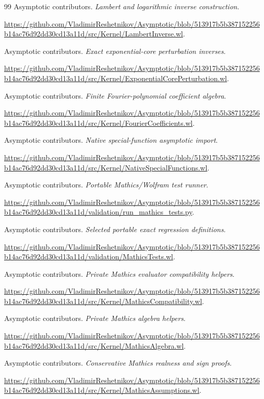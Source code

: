 \documentclass[11pt,letterpaper]{article}
\begin{document}
\begin{thebibliography}{99}
Asymptotic contributors. \emph{Lambert and logarithmic inverse construction}.\par
\url{https://github.com/VladimirReshetnikov/Asymptotic/blob/513917b5b387152256b14ac76d92dd30cd13a11d/src/Kernel/LambertInverse.wl}.

Asymptotic contributors. \emph{Exact exponential-core perturbation inverses}.\par
\url{https://github.com/VladimirReshetnikov/Asymptotic/blob/513917b5b387152256b14ac76d92dd30cd13a11d/src/Kernel/ExponentialCorePerturbation.wl}.

Asymptotic contributors. \emph{Finite Fourier-polynomial coefficient algebra}.\par
\url{https://github.com/VladimirReshetnikov/Asymptotic/blob/513917b5b387152256b14ac76d92dd30cd13a11d/src/Kernel/FourierCoefficients.wl}.

Asymptotic contributors. \emph{Native special-function asymptotic import}.\par
\url{https://github.com/VladimirReshetnikov/Asymptotic/blob/513917b5b387152256b14ac76d92dd30cd13a11d/src/Kernel/NativeSpecialFunctions.wl}.

Asymptotic contributors. \emph{Portable Mathics/Wolfram test runner}.\par
\url{https://github.com/VladimirReshetnikov/Asymptotic/blob/513917b5b387152256b14ac76d92dd30cd13a11d/validation/run_mathics_tests.py}.

Asymptotic contributors. \emph{Selected portable exact regression definitions}.\par
\url{https://github.com/VladimirReshetnikov/Asymptotic/blob/513917b5b387152256b14ac76d92dd30cd13a11d/validation/MathicsTests.wl}.

Asymptotic contributors. \emph{Private Mathics evaluator compatibility helpers}.\par
\url{https://github.com/VladimirReshetnikov/Asymptotic/blob/513917b5b387152256b14ac76d92dd30cd13a11d/src/Kernel/MathicsCompatibility.wl}.

Asymptotic contributors. \emph{Private Mathics algebra helpers}.\par
\url{https://github.com/VladimirReshetnikov/Asymptotic/blob/513917b5b387152256b14ac76d92dd30cd13a11d/src/Kernel/MathicsAlgebra.wl}.

Asymptotic contributors. \emph{Conservative Mathics realness and sign proofs}.\par
\url{https://github.com/VladimirReshetnikov/Asymptotic/blob/513917b5b387152256b14ac76d92dd30cd13a11d/src/Kernel/MathicsAssumptions.wl}.


\end{thebibliography}
\end{document}
